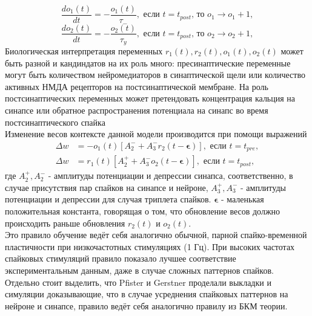 \documentclass[a4paper,10pt]{article}
\begin{document}
\begin{equation}
\frac{do_{1}(t)}{dt} = -\frac{o_{1}(t)}{\tau_{-}}, \mbox{ если } t=t_{post}\mbox{, то }o_{1} \rightarrow o_{1} + 1,
\end{equation}
\begin{equation*}
\frac{do_{2}(t)}{dt} = -\frac{o_{2}(t)}{\tau_{y}}, \mbox{ если } t=t_{post}\mbox{, то }o_{2} \rightarrow o_{2} + 1,
\end{equation*}
\indent Биологическая интерпретация переменных $r_{1}(t),r_{2}(t), o_{1}(t), o_{2}(t)$ может быть разной и кандиндатов на их роль много: пресинаптические переменные могут быть количеством нейромедиаторов в синаптической щели или количество активных НМДА рецепторов на постсинаптической мембране. На роль постсинаптических переменных может претендовать концентрация кальция на синапсе или обратное распространения потенциала на синапс во время постсинаптического спайка \\
\indent Изменение весов контексте данной модели производится при помощи выражений
\begin{equation}
\begin{split}
\Delta w &= - o_{1}(t)[A_{2}^{-}+A_{3}^{-}r_{2}(t-\boldsymbol{\epsilon})], \mbox{ если } t=t_{pre},\\
\Delta w &= r_{1}(t)[A_{2}^{+}+A_{3}^{-}o_{2}(t-\boldsymbol{\epsilon})], \mbox{ если } t=t_{post},
\end{split}
\end{equation}
где $A_{2}^{+},A_{2}^{-}$ - амплитуды потенциации и депрессии синапса, соответственно, в случае присутствия пар спайков на синапсе и нейроне, $A_{3}^{+},A_{3}^{-}$ - амплитуды потенциации и депрессии для случая триплета спайков. $\boldsymbol{\epsilon}$ - маленькая положительная константа, говорящая о том, что обновление весов должно происходить раньше обновления $r_{2}(t)$ и  $o_{2}(t)$.\\
\indent Это правило обучение ведёт себя аналогично обычной, парной спайко-временной пластичности при низкочастотных стимуляциях (1 Гц). При высоких частотах спайковых стимуляций правило показало лучшее соответствие экспериментальным данным, даже в случае сложных паттернов спайков.\\
\indent Отдельно стоит выделить, что Pfister и Gerstner проделали выкладки и симуляции доказывающие, что в случае усреднения спайковых паттернов на нейроне и синапсе, правило ведёт себя аналогично правилу из БКМ теории.\\
\end{document}
